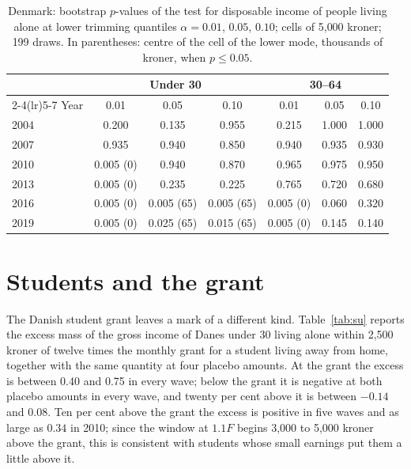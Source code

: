 \begin{table}[t]
\centering\small
\caption{Denmark: bootstrap $p$-values of the test for disposable income of people living alone at lower trimming quantiles $\alpha=0.01$, $0.05$, $0.10$; cells of 5{,}000 kroner; 199 draws. In parentheses: centre of the cell of the lower mode, thousands of kroner, when $p\le0.05$.}\label{tab:trim}
\begin{tabular}{lccc@{\hspace{16pt}}ccc}
\toprule
 & \multicolumn{3}{c}{Under 30} & \multicolumn{3}{c}{30--64}\\
\cmidrule(lr){2-4}\cmidrule(lr){5-7}
Year & 0.01 & 0.05 & 0.10 & 0.01 & 0.05 & 0.10\\
\midrule
2004 & 0.200 & 0.135 & 0.955 & 0.215 & 1.000 & 1.000\\
2007 & 0.935 & 0.940 & 0.850 & 0.940 & 0.935 & 0.930\\
2010 & 0.005 (0) & 0.940 & 0.870 & 0.965 & 0.975 & 0.950\\
2013 & 0.005 (0) & 0.235 & 0.225 & 0.765 & 0.720 & 0.680\\
2016 & 0.005 (0) & 0.005 (65) & 0.005 (65) & 0.005 (0) & 0.060 & 0.320\\
2019 & 0.005 (0) & 0.025 (65) & 0.015 (65) & 0.005 (0) & 0.145 & 0.140\\
\bottomrule
\end{tabular}
\end{table}

\section{Students and the grant}\label{app:su}

The Danish student grant leaves a mark of a different kind. Table~\ref{tab:su} reports the excess mass of the gross income of Danes under 30 living alone within 2{,}500 kroner of twelve times the monthly grant for a student living away from home, together with the same quantity at four placebo amounts. At the grant the excess is between 0.40 and 0.75 in every wave; below the grant it is negative at both placebo amounts in every wave, and twenty per cent above it is between $-0.14$ and $0.08$. Ten per cent above the grant the excess is positive in five waves and as large as $0.34$ in 2010; since the window at $1.1F$ begins 3{,}000 to 5{,}000 kroner above the grant, this is consistent with students whose small earnings put them a little above it.

